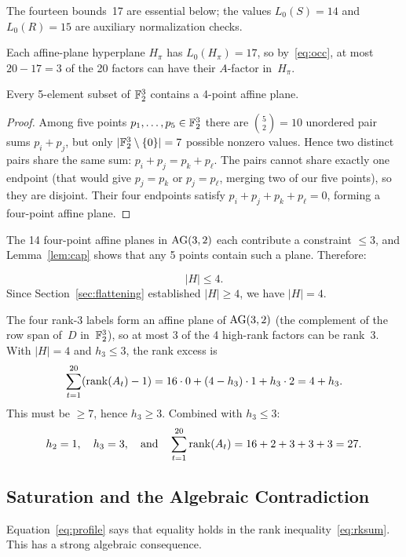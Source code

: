 \documentclass[11pt,a4paper]{article}
\begin{document}
The fourteen bounds~17 are essential below; the values $L_0(S)=14$ and $L_0(R)=15$ are auxiliary normalization checks.

Each affine-plane hyperplane $H_\pi$ has $L_0(H_\pi)=17$, so by~\eqref{eq:occ}, at most $20-17=3$ of the 20 factors can have their $A$-factor in~$H_\pi$.

\begin{lemma}\label{lem:cap}
  Every 5-element subset of $\mathbb{F}_2^3$ contains a 4-point affine plane.
\end{lemma}

\begin{proof}
  Among five points $p_1,\ldots,p_5\in\mathbb{F}_2^3$ there are $\binom{5}{2}=10$ unordered pair sums $p_i+p_j$, but only $|\mathbb{F}_2^3\setminus\{0\}|=7$ possible nonzero values.  Hence two distinct pairs share the same sum: $p_i+p_j=p_k+p_\ell$.  The pairs cannot share exactly one endpoint (that would give $p_j=p_k$ or $p_j=p_\ell$, merging two of our five points), so they are disjoint.  Their four endpoints satisfy $p_i+p_j+p_k+p_\ell=0$, forming a four-point affine plane.
\end{proof}

The 14 four-point affine planes in $\operatorname{AG}(3,2)$ each contribute a constraint $\le 3$, and Lemma~\ref{lem:cap} shows that any 5 points contain such a plane.  Therefore:

\begin{equation}\label{eq:highcount}
  |H|\le 4.
\end{equation}
Since Section~\ref{sec:flattening} established $|H|\ge 4$, we have $|H|=4$.

The four rank-3 labels form an affine plane of $\operatorname{AG}(3,2)$ (the complement of the row span of~$D$ in~$\mathbb{F}_2^3$), so at most 3 of the 4 high-rank factors can be rank~3.  With $|H|=4$ and $h_3\le 3$, the rank excess is
\[
  \sum_{t=1}^{20}(\operatorname{rank}(A_t)-1) = 16\cdot 0 + (4-h_3)\cdot 1 + h_3\cdot 2 = 4+h_3.
\]
This must be $\ge 7$, hence $h_3\ge 3$.  Combined with $h_3\le 3$:
\begin{equation}\label{eq:profile}
  h_2=1,\quad h_3=3,\quad\text{and}\quad \sum_{t=1}^{20}\operatorname{rank}(A_t) = 16+2+3+3+3 = 27.
\end{equation}

\subsection{Saturation and the Algebraic Contradiction}\label{sec:saturation}

Equation~\eqref{eq:profile} says that equality holds in the rank inequality~\eqref{eq:rksum}.  This has a strong algebraic consequence.
\end{document}

